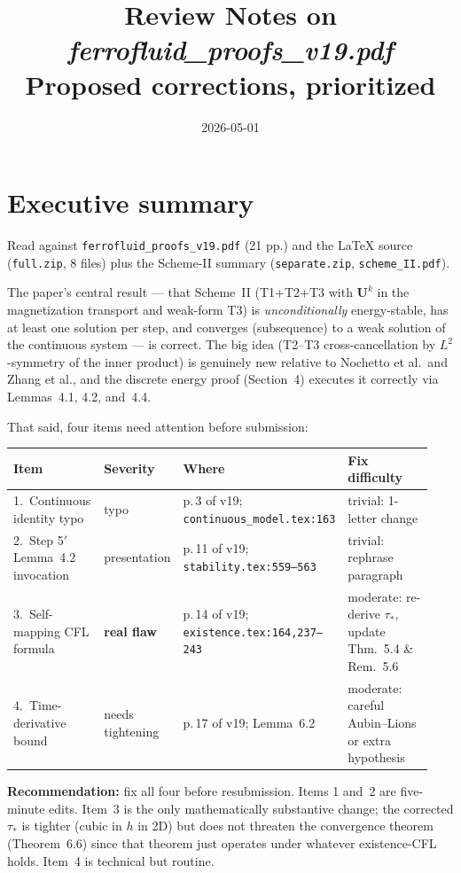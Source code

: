 \documentclass[11pt]{article}
\title{Review Notes on \emph{ferrofluid\_proofs\_v19.pdf}\\
       \large Proposed corrections, prioritized}
\author{}
\date{2026-05-01}
\newcommand{\bU}{\mathbf{U}}
\newcommand{\dt}{\tau}
\begin{document}
\maketitle

\section*{Executive summary}

Read against \texttt{ferrofluid\_proofs\_v19.pdf} (21 pp.) and the
LaTeX source (\texttt{full.zip}, 8 files) plus the Scheme-II summary
(\texttt{separate.zip}, \texttt{scheme\_II.pdf}).

The paper's central result --- that Scheme~II (T1+T2+T3 with
$\bU^k$ in the magnetization transport and weak-form T3) is
\emph{unconditionally} energy-stable, has at least one solution per
step, and converges (subsequence) to a weak solution of the continuous
system --- is correct.  The big idea (T2--T3 cross-cancellation by
$L^2$-symmetry of the inner product) is genuinely new relative to
Nochetto et al.\ and Zhang et al., and the discrete energy proof
(Section~4) executes it correctly via Lemmas~4.1, 4.2, and~4.4.

That said, four items need attention before submission:

\renewcommand{\arraystretch}{1.2}
\noindent
\begin{tabular}{@{}p{0.22\linewidth}p{0.13\linewidth}p{0.32\linewidth}p{0.27\linewidth}@{}}
\toprule
\textbf{Item} & \textbf{Severity} & \textbf{Where} & \textbf{Fix difficulty} \\
\midrule
1.\ Continuous identity typo &
typo &
p.\,3 of v19; \texttt{continuous\_model.tex:163} &
trivial: 1-letter change \\
2.\ Step 5$'$ Lemma~4.2 invocation &
presentation &
p.\,11 of v19; \texttt{stability.tex:559--563} &
trivial: rephrase paragraph \\
3.\ Self-mapping CFL formula &
\textbf{real flaw} &
p.\,14 of v19; \texttt{existence.tex:164,237--243} &
moderate: re-derive $\dt_*$, update Thm.~5.4 \& Rem.~5.6 \\
4.\ Time-derivative bound &
needs tightening &
p.\,17 of v19; Lemma~6.2 &
moderate: careful Aubin--Lions or extra hypothesis \\
\bottomrule
\end{tabular}
\medskip

\textbf{Recommendation:} fix all four before resubmission.  Items 1
and~2 are five-minute edits.  Item~3 is the only mathematically
substantive change; the corrected $\dt_*$ is tighter (cubic in $h$ in
2D) but does not threaten the convergence theorem (Theorem~6.6) since
that theorem just operates under whatever existence-CFL holds.
Item~4 is technical but routine.
\end{document}
